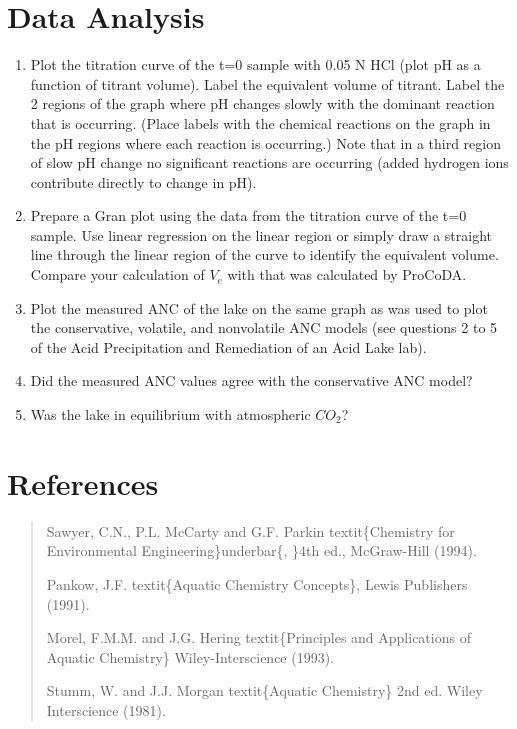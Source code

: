 \documentclass[letterpaper,10pt,english]{sphinxmanual}
\begin{document}
\section{Data Analysis}
\label{\detokenize{Acid_Neutralizing_Capacity/Acid_Neutralizing_Capacity:data-analysis}}\label{\detokenize{Acid_Neutralizing_Capacity/Acid_Neutralizing_Capacity:heading-anc-data-analysis}}\begin{enumerate}
\item {} 
Plot the titration curve of the t=0 sample with 0.05 N HCl (plot pH as a function of titrant volume). Label the equivalent volume of titrant. Label the 2 regions of the graph where pH changes slowly with the dominant reaction that is occurring. (Place labels with the chemical reactions on the graph in the pH regions where each reaction is occurring.) Note that in a third region of slow pH change no significant reactions are occurring (added hydrogen ions contribute directly to change in pH).

\item {} 
Prepare a Gran plot using the data from the titration curve of the t=0 sample. Use linear regression on the linear region or simply draw a straight line through the linear region of the curve to identify the equivalent volume. Compare your calculation of \(V_e\) with that was calculated by ProCoDA.

\item {} 
Plot the measured ANC of the lake on the same graph as was used to plot the conservative, volatile, and nonvolatile ANC models (see questions 2 to 5 of the Acid Precipitation and Remediation of an Acid Lake lab).

\item {} 
Did the measured ANC values agree with the conservative ANC model?

\item {} 
Was the lake in equilibrium with atmospheric \(CO_2\)?

\end{enumerate}


\section{References}
\label{\detokenize{Acid_Neutralizing_Capacity/Acid_Neutralizing_Capacity:references}}\label{\detokenize{Acid_Neutralizing_Capacity/Acid_Neutralizing_Capacity:heading-anc-references}}\begin{quote}

Sawyer, C.N., P.L. McCarty and G.F. Parkin textit\{Chemistry for Environmental Engineering\}underbar\{, \}4th ed., McGraw-Hill (1994).

Pankow, J.F. textit\{Aquatic Chemistry Concepts\}, Lewis Publishers (1991).

Morel, F.M.M. and J.G. Hering textit\{Principles and Applications of Aquatic Chemistry\} Wiley-Interscience (1993).

Stumm, W. and J.J. Morgan textit\{Aquatic Chemistry\} 2nd ed. Wiley Interscience (1981).
\end{quote}
\end{document}

